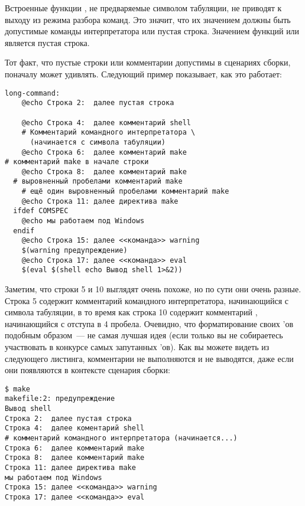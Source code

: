 Встроенные функции \GNUmake{}, не предваряемые символом табуляции, не
приводят к выходу из режима разбора команд. Это значит, что их
значением должны быть допустимые команды интерпретатора или пустая
строка.  Значением функций  или 
является пустая строка.

Тот факт, что пустые строки или комментарии \GNUmake{} допустимы в
сценариях сборки, поначалу может удивлять. Следующий пример
показывает, как это работает:

{\footnotesize
\begin{verbatim}
long-command:
    @echo Строка 2:  далее пустая строка

    @echo Строка 4:  далее комментарий shell
    # Комментарий командного интерпретатора \
      (начинается с символа табуляции)
    @echo Строка 6:  далее комментарий make
# комментарий make в начале строки
    @echo Строка 8:  далее комментарий make
  # выровненный пробелами комментарий make
    # ещё один выровненный пробелами комментарий make
    @echo Строка 11: далее директива make
  ifdef COMSPEC
    @echo мы работаем под Windows
  endif
    @echo Строка 15: далее <<команда>> warning
    $(warning предупреждение)
    @echo Строка 17: далее <<команда>> eval
    $(eval $(shell echo Вывод shell 1>&2))
\end{verbatim}
}

Заметим, что строки 5 и 10 выглядят очень похоже, но по сути они очень
разные. Строка 5 содержит комментарий командного интерпретатора,
начинающийся с символа табуляции, в то время как строка 10 содержит
комментарий \GNUmake{}, начинающийся с отступа в 4 пробела.  Очевидно,
что форматирование своих \Makefile{}'ов подобным образом~--- не самая
лучшая идея (если только вы не собираетесь участвовать в конкурсе
самых запутанных \Makefile{}'ов). Как вы можете видеть из следующего
листинга, комментарии \GNUmake{} не выполняются и не выводятся, даже
если они появляются в контексте сценария сборки:

{\footnotesize
\begin{verbatim}
$ make
makefile:2: предупреждение
Вывод shell
Строка 2:  далее пустая строка
Строка 4:  далее коментарий shell
# комментарий командного интерпретатора (начинается...)
Строка 6:  далее комментарий make
Строка 8:  далее комментарий make
Строка 11: далее директива make
мы работаем под Windows
Строка 15: далее <<команда>> warning
Строка 17: далее <<команда>> eval
\end{verbatim}
}

